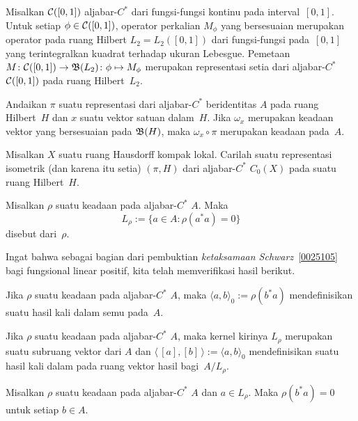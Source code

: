 \begin{exam} Misalkan $\mathcal{C}([0,1])$ aljabar-$C^*$ dari fungsi-fungsi kontinu
pada interval~$[0,1]$. Untuk setiap $\phi \in \mathcal{C}([0,1])$, operator perkalian
$M_\phi$ yang bersesuaian merupakan operator pada ruang Hilbert $L_2 = L_2([0,1])$
dari fungsi-fungsi pada~$[0,1]$ yang terintegralkan kuadrat terhadap ukuran Lebesgue.
Pemetaan $M\colon \mathcal{C}([0,1]) \rightarrow \mathfrak{B}(L_2)\colon \phi \mapsto M_\phi$ merupakan
representasi setia dari aljabar-$C^*$ $\mathcal{C}([0,1])$ pada ruang Hilbert~$L_2$.
\end{exam}

\begin{exam} Andaikan $\pi$ suatu representasi dari aljabar-$C^*$ beridentitas $A$ pada
ruang Hilbert~$H$ dan $x$ suatu vektor satuan dalam~$H$. Jika $\omega _x$ merupakan
keadaan vektor yang bersesuaian pada $\mathfrak{B}(H)$, maka $\omega_x \circ \pi$ merupakan keadaan pada~$A$.
\end{exam}

\begin{exer} Misalkan $X$ suatu ruang Hausdorff kompak lokal. Carilah suatu representasi
isometrik (dan karena itu setia) $(\pi,H)$ dari aljabar-$C^*$ $C_0(X)$ pada suatu
ruang Hilbert~$H$.
\end{exer}

\begin{defn} Misalkan $\rho$ suatu keadaan pada aljabar-$C^*$ $A$. Maka
   \[ L_\rho := \{a \in A\colon \rho(a^*a) = 0\} \]
disebut
 dari~$\rho$.
\end{defn}

Ingat bahwa sebagai bagian dari pembuktian \emph{ketaksamaan Schwarz}~\ref{0025105} bagi fungsional
linear positif, kita telah memverifikasi hasil berikut.

\begin{prop} Jika $\rho$ suatu keadaan pada aljabar-$C^*$ $A$, maka $\langle a,b \rangle_0 :=
\rho(b^*a)$ mendefinisikan suatu hasil kali dalam semu pada~$A$.
\end{prop}

\begin{cor} Jika $\rho$ suatu keadaan pada aljabar-$C^*$ $A$, maka kernel kirinya $L_\rho$ merupakan suatu
subruang vektor dari $A$ dan $\langle\,[a],[b]\,\rangle := \langle a,b \rangle_0$ mendefinisikan
suatu hasil kali dalam pada ruang vektor hasil bagi~$A/L_\rho$.
\end{cor}

\begin{prop} Misalkan $\rho$ suatu keadaan pada aljabar-$C^*$ $A$ dan $a \in L_\rho$. Maka $\rho(b^*a)
= 0$ untuk setiap $b \in A$.
\end{prop}

